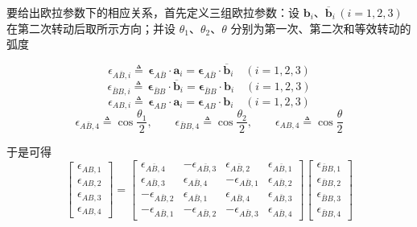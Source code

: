 要给出欧拉参数下的相应关系，首先定义三组欧拉参数：设 $\mathbf{b}_i$、$\overline{\mathbf{b}}_i\,(i=1,2,3)$ 在第二次转动后取所示方向；并设 $\theta_1$、$\theta_2$、$\theta$ 分别为第一次、第二次和等效转动的弧度

\begin{equation}\label{eq:连续转动:epsilon_Abar_B_i}
\epsilon_{A\bar B,i}\triangleq\,\bm{\epsilon}_{A\bar B}\cdot\mathbf{a}_i=\bm{\epsilon}_{A\bar B}\cdot\overline{\mathbf{b}}_i\quad(i=1,2,3)
\end{equation}
\begin{equation}\label{eq:连续转动:epsilon_Bar_B_B_i}
\epsilon_{\bar B B,i}\triangleq\,\bm{\epsilon}_{\bar B B}\cdot\overline{\mathbf{b}}_i=\bm{\epsilon}_{\bar B B}\cdot\mathbf{b}_i\quad(i=1,2,3)
\end{equation}
\begin{equation}\label{eq:连续转动:epsilon_AB_i}
\epsilon_{AB,i}\triangleq\,\bm{\epsilon}_{AB}\cdot\mathbf{a}_i=\bm{\epsilon}_{AB}\cdot\mathbf{b}_i\quad(i=1,2,3)
\end{equation}
$$
\epsilon_{A\bar B,4}\triangleq\cos\frac{\theta_1}{2},\qquad
\epsilon_{\bar B B,4}\triangleq\cos\frac{\theta_2}{2},\qquad
\epsilon_{AB,4}\triangleq\cos\frac{\theta}{2}
$$

于是可得
\begin{equation}\label{eq:连续转动:欧拉参数关系}
\begin{bmatrix}
\epsilon_{AB,1}\\[2pt] \epsilon_{AB,2}\\[2pt] \epsilon_{AB,3}\\[2pt] \epsilon_{AB,4}
\end{bmatrix}
=
\begin{bmatrix}
\epsilon_{A\bar B,4} & -\epsilon_{A\bar B,3} & \epsilon_{A\bar B,2} & \epsilon_{A\bar B,1}\\
\epsilon_{A\bar B,3} & \epsilon_{A\bar B,4} & -\epsilon_{A\bar B,1} & \epsilon_{A\bar B,2}\\
-\epsilon_{A\bar B,2} & \epsilon_{A\bar B,1} & \epsilon_{A\bar B,4} & \epsilon_{A\bar B,3}\\
-\epsilon_{A\bar B,1} & -\epsilon_{A\bar B,2} & -\epsilon_{A\bar B,3} & \epsilon_{A\bar B,4}
\end{bmatrix}
\begin{bmatrix}
\epsilon_{\bar B B,1}\\[2pt] \epsilon_{\bar B B,2}\\[2pt] \epsilon_{\bar B B,3}\\[2pt] \epsilon_{\bar B B,4}
\end{bmatrix}
\end{equation}

